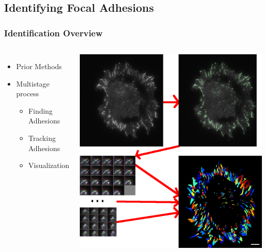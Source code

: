 \documentclass{beamer}
\begin{document}
\subsection{Identifying Focal Adhesions}
\begin{frame}
	\frametitle{Identification Overview}
	\begin{columns}
	\begin{itemize}
	\item Prior Methods
	\item Multistage process
		\begin{itemize}
		\item Finding Adhesions
		\item Tracking Adhesions
		\item Visualization
		\end{itemize}
	\end{itemize}
	\includegraphics[width=\textwidth]{figures/finding/ident_overview}
	\end{columns}
\end{frame}
\end{document}
